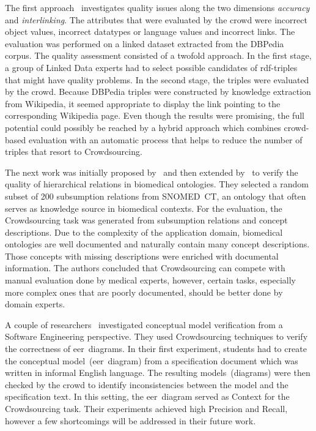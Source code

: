 The first approach~\cite{acosta2018} investigates quality issues along the two dimensions \emph{accuracy} and \emph{interlinking}. The attributes that were evaluated by the crowd were incorrect object values, incorrect datatypes or language values and incorrect links. The evaluation was performed on a linked dataset extracted from the DBPedia corpus. The quality assessment consisted of a twofold approach. In the first stage, a group of Linked Data experts had to select possible candidates of \gls{rdf}-triples that might have quality problems. In the second stage, the triples were evaluated by the crowd. Because DBPedia triples were constructed by knowledge extraction from Wikipedia, it seemed appropriate to display the link pointing to the corresponding Wikipedia page. Even though the results were promising, the full potential could possibly be reached by a hybrid approach which combines crowd-based evaluation with an automatic process that helps to reduce the number of triples that resort to Crowdsourcing. 

The next work was initially proposed by~\cite{mortensen2015} and then extended by~\cite{mortensen2016} to verify the quality of hierarchical relations in biomedical ontologies. They selected a random subset of 200 subsumption relations from SNOMED~CT, an ontology that often serves as knowledge source in biomedical contexts. For the evaluation, the Crowdsourcing task was generated from subsumption relations and concept descriptions. Due to the complexity of the application domain, biomedical ontologies are well documented and naturally contain many concept descriptions. Those concepts with missing descriptions were enriched with documental information. The authors concluded that Crowdsourcing can compete with manual evaluation done by medical experts, however, certain tasks, especially more complex ones that are poorly documented, should be better done by domain experts. 

A couple of researchers~\cite{sabou2018, winkler2017, winkler2017_2} investigated conceptual model verification from a Software Engineering perspective. They used Crowdsourcing techniques to verify the correctness of \gls{eer}~diagrams. In their first experiment, students had to create the conceptual model~(\gls{eer}~diagram) from a specification document which was written in informal English language. The resulting models~(diagrams) were then checked by the crowd to identify inconsistencies between the model and the specification text. In this setting, the \gls{eer}~diagram served as Context for the Crowdsourcing task. Their experiments achieved high Precision and Recall, however a few shortcomings will be addressed in their future work. 

